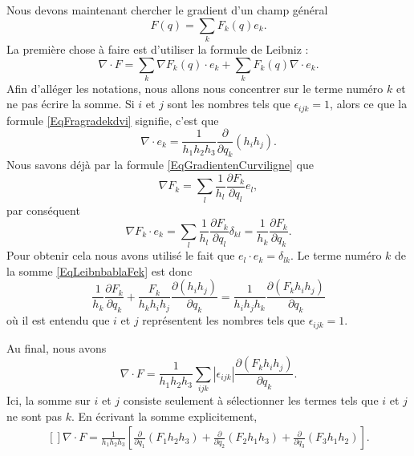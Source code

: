Nous devons maintenant chercher le gradient d'un champ général
\begin{equation}
	F(q)=\sum_kF_k(q)e_k.
\end{equation}
La première chose à faire est d'utiliser la formule de Leibniz :
\begin{equation}        \label{EqLeibnbablaFek}
	\nabla\cdot F=\sum_k\nabla F_k(q)\cdot e_k+\sum_kF_k(q)\nabla\cdot e_k.
\end{equation}
Afin d'alléger les notations, nous allons nous concentrer sur le terme numéro \( k\) et ne pas écrire la somme. Si \( i\) et \( j\) sont les nombres tels que \( \epsilon_{ijk}=1\), alors ce que la formule \eqref{EqFragradekdvi} signifie, c'est que
\begin{equation}
	\nabla\cdot e_k=\frac{1}{ h_1h_2h_3 }\frac{ \partial  }{ \partial q_k }(h_ih_j).
\end{equation}
Nous savons déjà par la formule \eqref{EqGradientenCurviligne} que
\begin{equation}
	\nabla F_k=\sum_l\frac{1}{ h_l }\frac{ \partial F_k }{ \partial q_l }e_l,
\end{equation}
par conséquent
\begin{equation}
	\nabla F_k\cdot e_k=\sum_l\frac{1}{ h_l }\frac{ \partial F_k }{ \partial q_l }\delta_{kl}=\frac{1}{ h_k }\frac{ \partial F_k }{ \partial q_k }.
\end{equation}
Pour obtenir cela nous avons utilisé le fait que \( e_l\cdot e_k=\delta_{lk}\). Le terme numéro \( k\) de la somme \eqref{EqLeibnbablaFek} est donc
\begin{equation}
	\frac{1}{ h_k }\frac{ \partial F_k }{ \partial q_k }+\frac{ F_k }{ h_kh_ih_j }\frac{ \partial (h_ih_j) }{ \partial q_k }=\frac{1}{ h_ih_jh_k }\frac{ \partial (F_kh_ih_j) }{ \partial q_k }
\end{equation}
où il est entendu que \( i\) et \( j\) représentent les nombres tels que \( \epsilon_{ijk}=1\).

Au final, nous avons
\begin{equation}
	\nabla\cdot F=\frac{1}{ h_1h_2h_3 }\sum_{ijk}| \epsilon_{ijk} |\frac{ \partial (F_kh_ih_j) }{ \partial q_k }.
\end{equation}
Ici, la somme sur \( i\) et \( j\) consiste seulement à sélectionner les termes tels que \( i\) et \( j\) ne sont pas \( k\). En écrivant la somme explicitement,
\begin{equation}
	\begin{aligned}[]
		\nabla\cdot F=\frac{1}{ h_1h_2h_3 }\left[ \frac{ \partial  }{ \partial q_1 }(F_1h_2h_3)+\frac{ \partial  }{ \partial q_2 }(F_2h_1h_3)+\frac{ \partial  }{ \partial q_3 }(F_3h_1h_2) \right].
	\end{aligned}
\end{equation}

